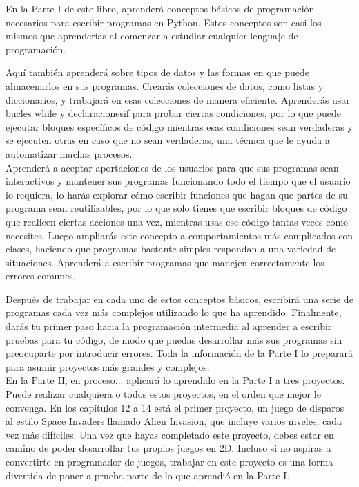 En la Parte I de este libro, aprenderá conceptos básicos de programación  necesarios para escribir programas en Python. Estos conceptos son casi los mismos que aprenderías al comenzar a estudiar cualquier lenguaje de programación.

Aquí también aprenderá sobre tipos de datos y las formas en que puede almacenarlos en sus programas. Crearás colecciones de 
datos, como listas y diccionarios, y trabajará en esas colecciones de manera eficiente. 
Aprenderás usar bucles {\ttfamily while} y declaraciones{\ttfamily if} para probar ciertas condiciones, por lo que puede ejecutar bloques específicos de código mientras esas condiciones sean verdaderas y se ejecuten otras en caso que no sean verdaderas, una técnica que le 
ayuda a automatizar muchas procesos.\\

Aprenderá a aceptar aportaciones de los usuarios para que sus programas sean interactivos y mantener sus programas funcionando todo 
el tiempo que el usuario lo requiera,  lo harás explorar cómo escribir funciones que hagan que partes de su programa sean reutilizables,
por lo que solo tienes que escribir bloques de código que realicen ciertas acciones una vez, mientras usas ese código tantas veces 
como necesites. Luego ampliarás este concepto a comportamientos más complicados con clases, haciendo que programas bastante simples respondan a una variedad de situaciones. Aprenderá a escribir programas que manejen correctamente los errores comunes.

Después de trabajar en cada uno de estos conceptos básicos, escribirá una serie de programas cada vez más complejos utilizando lo que ha aprendido. Finalmente, darás tu primer paso hacia la programación intermedia al aprender a escribir pruebas para tu código, de modo que puedas desarrollar más sus programas sin preocuparte por introducir errores. Toda la información de la Parte I lo preparará para asumir proyectos más grandes y complejos.\\


En la Parte II, en proceso... aplicará lo aprendido en la Parte I a tres proyectos. Puede realizar cualquiera o todos estos proyectos, en el orden que mejor le convenga. En los capítulos 12 a 14 está el primer proyecto,  un juego de disparos al estilo Space Invaders llamado Alien Invasion, que incluye varios niveles, cada vez más difíciles. Una vez que hayas completado este proyecto, debes estar en camino de poder desarrollar tus propios juegos en 2D. Incluso si no aspiras a convertirte en programador de juegos, trabajar en este proyecto es una forma divertida de poner a prueba  parte de lo que aprendió  en la Parte I.\\

